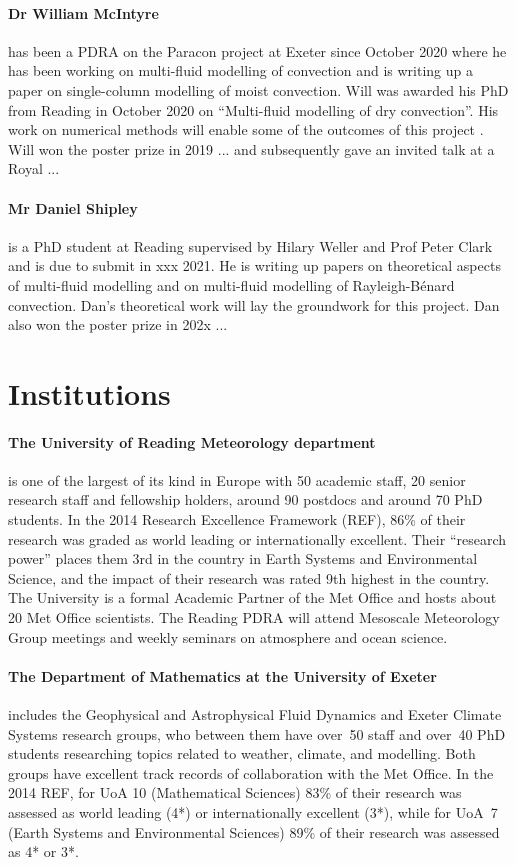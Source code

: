 \documentclass[11pt,a4paper]{article}
\begin{document}
\paragraph*{Dr William McIntyre} has been a PDRA on the Paracon project at Exeter since October 2020 where he has been working on multi-fluid modelling of convection and is writing up a paper on single-column modelling of moist convection. Will was awarded his PhD from Reading in October 2020 on ``Multi-fluid modelling of dry convection''. His work on numerical methods will enable some of the outcomes of this project \cite{MWH20}. Will won the poster prize in 2019 ... and subsequently gave an invited talk at a Royal ...

\paragraph*{Mr Daniel Shipley} is a PhD student at Reading supervised by Hilary Weller and Prof Peter Clark and is due to submit in xxx 2021. He is writing up papers on theoretical aspects of multi-fluid modelling and on multi-fluid modelling of Rayleigh-B\'{e}nard convection. Dan's theoretical work will lay the groundwork for this project. Dan also won the poster prize in 202x ...

\section*{Institutions}

\paragraph*{The University of Reading Meteorology department} is one of the largest of its kind in Europe with 50 academic staff, 20 senior research staff and fellowship holders, around 90 postdocs and around 70 PhD students. In the 2014 Research Excellence Framework (REF), 86\% of their research was graded as world leading or internationally excellent. Their ``research power'' places them 3rd in the country in Earth Systems and Environmental Science, and the impact of their research was rated 9th highest in the country. The University is a formal Academic Partner of the Met Office and hosts about 20 Met Office scientists. The Reading PDRA will attend Mesoscale Meteorology Group meetings and weekly seminars on atmosphere and ocean science.

\paragraph*{The Department of Mathematics at the University of Exeter} includes the Geophysical and Astrophysical Fluid Dynamics and Exeter Climate Systems research groups, who between them have over~50 staff and over~40 PhD students researching topics related to weather, climate, and modelling. Both groups have excellent track records of collaboration with the Met Office. In the 2014 REF, for UoA 10 (Mathematical Sciences) 83\% of their research was assessed as world leading (4*) or internationally excellent (3*), while for UoA~7 (Earth Systems and Environmental Sciences) 89\% of their research was assessed as 4* or 3*.
\end{document}
